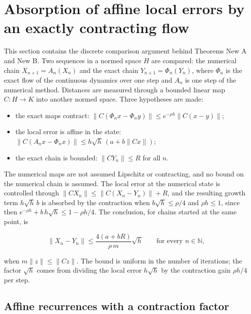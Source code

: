 \documentclass[11pt,a4paper]{report}
\begin{document}
\section{\texorpdfstring{Absorption of affine local errors by an exactly contracting flow}{Absorption of affine local errors by an exactly contracting flow}}


This section contains the discrete comparison argument behind Theorems New A and New B. Two sequences in a normed space \(H\) are compared: the numerical chain \(X_{n+1}=A_n(X_n)\) and the exact chain \(Y_{n+1}=\Phi_n(Y_n)\), where \(\Phi_n\) is the exact flow of the continuous dynamics over one step and \(A_n\) is one step of the numerical method. Distances are measured through a bounded linear map \(C:H\to K\) into another normed space. Three hypotheses are made:



\begin{itemize}


\item the exact maps contract: \(\|C(\Phi_nx-\Phi_ny)\|\le e^{-\rho h}\|C(x-y)\|\);

\item the local error is affine in the state: \(\|C(A_nx-\Phi_nx)\|\le h\sqrt h\,(a+b\|Cx\|)\);

\item the exact chain is bounded: \(\|CY_n\|\le R\) for all \(n\).

\end{itemize}



The numerical maps are not assumed Lipschitz or contracting, and no bound on the numerical chain is assumed. The local error at the numerical state is controlled through \(\|CX_n\|\le\|C(X_n-Y_n)\|+R\), and the resulting growth term \(h\sqrt h\,b\) is absorbed by the contraction when \(b\sqrt h\le\rho/4\) and \(\rho h\le1\), since then \(e^{-\rho h}+b\,h\sqrt h\le1-\rho h/4\). The conclusion, for chains started at the same point, is


\[\|X_n-Y_n\|\le\frac{4(a+bR)}{\rho\,m}\sqrt h\qquad\text{for every }n\in\mathbb N,\]


when \(m\|z\|\le\|Cz\|\). The bound is uniform in the number of iterations; the factor \(\sqrt h\) comes from dividing the local error \(h\sqrt h\) by the contraction gain \(\rho h/4\) per step.

\subsection{\texorpdfstring{Affine recurrences with a contraction factor}{Affine recurrences with a contraction factor}}
\end{document}
